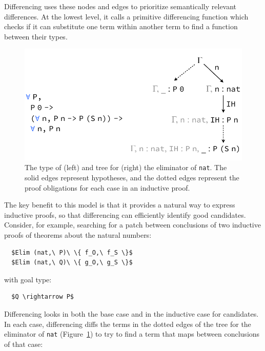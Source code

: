 Differencing uses these nodes and edges to prioritize semantically
relevant differences. At the lowest level, it calls a primitive differencing function 
which checks if it can substitute one term within another term to find a function between their types.

\begin{figure}[t]
\begin{center}
\includegraphics[scale=0.55]{repair/nat_ind}
\end{center}
\caption{The type of (left) and tree for (right) the eliminator of \lstinline{nat}. The solid edges represent hypotheses, and the dotted edges represent the proof obligations for each case in an inductive proof.} %
\label{fig:cattree}
\end{figure}

The key benefit to this model is that it provides a natural way to express inductive proofs, so
that differencing can efficiently identify good candidates.
Consider, for example, searching for a patch between conclusions of two inductive proofs of theorems about the natural numbers:

\begin{lstlisting}
  $Elim (nat,\ P)\ \{ f_O,\ f_S \}$
  $Elim (nat,\ Q)\ \{ g_O,\ g_S \}$ 
\end{lstlisting}
with goal type:

\begin{lstlisting}
  $Q \rightarrow P$
\end{lstlisting}

Differencing looks in both the base case and in the inductive case for candidates.
In each case, differencing diffs the terms in the dotted edges of the tree for the eliminator of \lstinline{nat} (Figure~\ref{fig:cattree}) to
try to find a term that maps between conclusions of that case:

